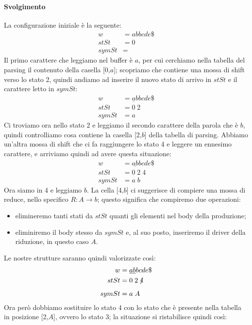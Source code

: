 \documentclass[class=book, crop=false, oneside, 12pt]{standalone}
\begin{document}
\paragraph{Svolgimento}
La configurazione iniziale è la seguente:
\begin{align*}
    w &= abbcde\$ \\
    stSt &= 0 \\
    symSt &= 
\end{align*}
Il primo carattere che leggiamo nel buffer è \(a\), per cui cerchiamo nella tabella del parsing il contenuto della casella [0,\(a\)]; scopriamo che contiene una mossa di shift verso lo stato 2, quindi andiamo ad inserire il nuovo stato di arrivo in \(stSt\) e il carattere letto in \(symSt\):
\begin{align*}
    w &= \underline{a}bbcde\$ \\
    stSt &= 0\;2\\
    symSt &= a
\end{align*}
Ci troviamo ora nello stato 2 e leggiamo il secondo carattere della parola che è \(b\), quindi controlliamo cosa contiene la casella [2,\(b\)] della tabella di parsing. Abbiamo un'altra mossa di shift che ci fa raggiungere lo stato 4 e leggere un ennesimo carattere, e arriviamo quindi ad avere questa situazione:
\begin{align*}
    w &= \underline{ab}bcde\$ \\
    stSt &= 0\;2\;4\\
    symSt &= a\;b
\end{align*}
Ora siamo in 4 e leggiamo \(b\). La cella [4,\(b\)] ci suggerisce di compiere una mossa di reduce, nello specifico \(R: A \to b\); questo significa che compiremo due operazioni:
\begin{itemize}
    \item elimineremo tanti stati da \(stSt\) quanti gli elementi nel body della produzione;
    \item eliminiremo il body stesso da \(symSt\) e, al suo posto, inseriremo il driver della riduzione, in questo caso \(A\).
\end{itemize} 
Le nostre strutture saranno quindi valorizzate così: 
\begin{align*}
    w &= \underline{ab}bcde\$ \\
    stSt &= 0\;2\;\xout{4}\\
    symSt &= a\;A
\end{align*}
Ora però dobbiamo sostituire lo stato 4 con lo stato che è presente nella tabella in posizione [2,\(A\)], ovvero lo stato 3; la situazione si ristabilisce quindi così:
\end{document}
